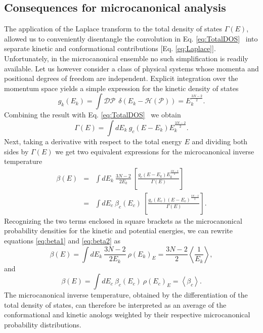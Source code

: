 \documentclass[12pt]{report}
\begin{document}
\subsection{Consequences for microcanonical analysis}
The application of the Laplace transform to the total density of states $\Gamma (E)$, allowed us to conveniently disentangle the convolution in Eq.\,\,\ref{eq:TotalDOS} \, into separate kinetic and conformational contributions [Eq. \ref{eq:Laplace}]. Unfortunately, in the microcanonical ensemble no such simplification is readily available. Let us however consider a class of physical systems whose momenta and positional degrees of freedom are independent. Explicit integration over the momentum space yields a simple expression for the kinetic density of states
\begin{equation}
g_{k}(E_{k}) = \int \mathcal{DP} \:\: \delta(E_{k} - \mathcal{H}(\mathcal{P})) 
			 = E_{k}^{\frac{3N-2}{2}}.
\end{equation}
Combining the result with Eq. \ref{eq:TotalDOS} \, we obtain
\begin{equation}
\Gamma(E) = \int dE_{k} \: g_{c}(E - E_{k})E_{k}^{\frac{3N-2}{2}}.
\end{equation}
Next, taking a derivative with respect to the total energy $E$ and dividing both sides by $\Gamma(E)$ we get two equivalent expressions for the microcanonical inverse temperature 
\begin{eqnarray}
\beta(E) &=& \int dE_{k} \:\frac{3N-2}{2E_{k}} \:\left[\frac{g_{c}(E - E_{k})E_{k}^{\frac{3N-2}{2}}}{\Gamma (E)}\right]
\label{eq:beta1}  \\
		&=& \int dE_{c} \: \beta_{c}(E_{c})\: \left[ \frac{g_{c}(E_{c})(E- E_{c})^{\frac{3N-2}{2}}}{\Gamma (E)} \right]
\label{eq:beta2}.  
\end{eqnarray}
Recognizing the two terms enclosed in square brackets as the microcanonical probability densities for the kinetic and potential energies,
we can rewrite equations \ref{eq:beta1} and \ref{eq:beta2} as
\newpage
\noindent
\begin{equation}
\label{eq:beta3}
\beta(E) = \int dE_{k} \:\frac{3N-2}{2E_{k}} \: \rho(E_{k})_{E} = \frac{3N-2}{2}\left\langle \frac{1}{E_{k}}  \right\rangle,
\end{equation}
and 
\begin{equation}
\label{eq:beta4}
\beta(E) = \int dE_{c} \: \beta_{c}(E_{c})\: \rho(E_{c})_{E} = \left\langle \beta_{c} \right\rangle.
\end{equation}
The microcanonical inverse temperature, obtained by the differentiation of the total density of states, can therefore be interpreted as an average of the conformational and kinetic anologs weighted by their respective microcanonical probability distributions.
\end{document}
